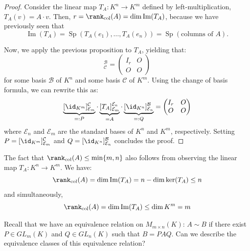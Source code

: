 \begin{proof}
Consider the linear map $T_A: K^n \to K^m$ defined by left-multiplication, $T_A(v) = A \cdot v$. Then, $r = \rank_{\text{col}}(A) = \dim \operatorname{Im}(T_A)$, because we have previously seen that 
\[\operatorname{Im}(T_A) = \operatorname{Sp}(T_A(e_1), \dots, T_A(e_n)) = \operatorname{Sp}(\text{columns of } A).\]

Now, we apply the previous proposition to $T_A$, yielding that:
\begin{equation*}
    [T_A]_{\mathcal{C}}^{\mathcal{B}} = \begin{pmatrix} I_r & O \\ O & O \end{pmatrix}
\end{equation*}
for some basis $\mathcal{B}$ of $K^n$ and some basis $\mathcal{C}$ of $K^m$. Using the change of basis formula, we can rewrite this as:
\begin{equation*}
    \underbrace{[\id_{K^m}]_{\mathcal{E}_m}^{\mathcal{C}}}_{=: P} \cdot \underbrace{[T_A]_{\mathcal{E}_m}^{\mathcal{E}_n}}_{= A} \cdot \underbrace{[\id_{K^n}]_{\mathcal{E}_n}^{\mathcal{B}}}_{=: Q} = \begin{pmatrix} I_r & O \\ O & O \end{pmatrix}
\end{equation*}
where $\mathcal{E}_n$ and $\mathcal{E}_m$ are the standard bases of $K^n$ and $K^m$, respectively. Setting $P = [\id_{K^m}]_{\mathcal{E}_m}^{\mathcal{C}}$ and $Q = [\id_{K^n}]_{\mathcal{E}_n}^{\mathcal{B}}$ concludes the proof.
\end{proof}

\begin{remark}
The fact that $\rank_{\text{col}}(A) \le \min\{m, n\}$ also follows from observing the linear map $T_A: K^n \to K^m$. We have:
\begin{equation*}
    \rank_{\text{col}}(A) = \dim \operatorname{Im}(T_A) = n - \dim \ker(T_A) \le n
\end{equation*}
and simultaneously,
\begin{equation*}
    \rank_{\text{col}}(A) = \dim \operatorname{Im}(T_A) \le \dim K^m = m
\end{equation*}
\end{remark}

\begin{question}
Recall that we have an equivalence relation on $M_{m \times n}(K)$: $A \sim B$ if there exist $P \in GL_m(K)$ and $Q \in GL_n(K)$ such that $B = PAQ$. Can we describe the equivalence classes of this equivalence relation?
\end{question}

